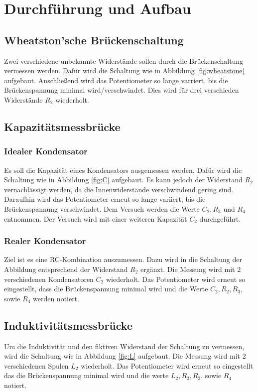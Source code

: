 \section{Durchführung und Aufbau}
\label{sec:Durchführung}

\subsection{Wheatston'sche Brückenschaltung}
Zwei verschiedene unbekannte Widerstände sollen durch die Brückenschaltung vermessen werden. Dafür wird die Schaltung wie in Abbildung \ref{fig:wheatstone} aufgebaut. Anschließend wird das Potentiometer so lange varriert, bis die Brückenspannung minimal wird/verschwindet. Dies wird für drei verschieden Widerstände $R_2$ wiederholt.

\subsection{Kapazitätsmessbrücke}
\subsubsection{Idealer Kondensator}
Es soll die Kapazität eines Kondensators ausgemessen werden. Dafür wird die Schaltung wie in Abbildung \ref{fig:C} aufgebaut. Es kann jedoch der Widerstand $R_2$ vernachlässigt werden, da die Innenwiderstände verschwindend gering sind. Daraufhin wird das Potentiometer erneut so lange variiert, bis die Brückenspannung verschwindet. Dem Versuch werden die Werte  $C_2, R_3$ und $R_4$ entnommen. Der Versuch wird mit einer weiteren Kapazität $C_2$ durchgeführt.

\subsubsection{Realer Kondensator}
Ziel ist es eine RC-Kombination auszumessen. Dazu wird in die Schaltung der Abbildung entsprechend der Widerstand $R_2$ ergänzt. Die Messung wird mit 2 verschiedenen Kondensatoren $C_2$ wiederholt. Das Potentiometer wird erneut so eingestellt, dass die Brückenspannung minimal wird und die Werte $C_2, R_2, R_3$, sowie $R_4$ werden notiert.

\subsection{Induktivitätsmessbrücke}
Um die Induktivität und den fiktiven Widerstand der Schaltung zu vermessen, wird die Schaltung wie in Abbildung \ref{fig:L} aufgebaut. Die Messung wird mit 2 verschiedenen Spulen $L_2$ wiederholt. Das Potentiometer wird erneut so eingestellt das die Brückenspannung minimal wird und die werte $L_2, R_2, R_3$, sowie $R_4$ notiert.

